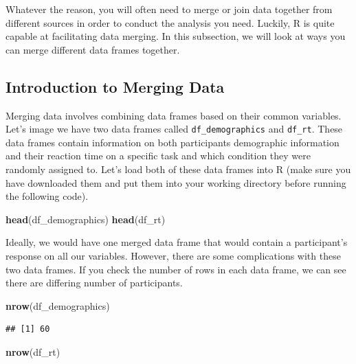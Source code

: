 \documentclass[
]{book}
\newenvironment{Shaded}{\begin{snugshade}}{\end{snugshade}}
\newcommand{\FunctionTok}[1]{\textcolor[rgb]{0.13,0.29,0.53}{\textbf{#1}}}
\newcommand{\NormalTok}[1]{#1}
\begin{document}
Whatever the reason, you will often need to merge or join data together from different sources in order to conduct the analysis you need. Luckily, R is quite capable at facilitating data merging. In this subsection, we will look at ways you can merge different data frames together.

\subsection{Introduction to Merging Data}\label{introduction-to-merging-data}

Merging data involves combining data frames based on their common variables. Let's image we have two data frames called \texttt{df\_demographics} and \texttt{df\_rt}. These data frames contain information on both participants demographic information and their reaction time on a specific task and which condition they were randomly assigned to. Let's load both of these data frames into R (make sure you have downloaded them and put them into your working directory before running the following code).

\begin{Shaded}
\begin{Highlighting}[]
\FunctionTok{head}\NormalTok{(df\_demographics)}
\FunctionTok{head}\NormalTok{(df\_rt)}
\end{Highlighting}
\end{Shaded}

Ideally, we would have one merged data frame that would contain a participant's response on all our variables. However, there are some complications with these two data frames. If you check the number of rows in each data frame, we can see there are differing number of participants.

\begin{Shaded}
\begin{Highlighting}[]
\FunctionTok{nrow}\NormalTok{(df\_demographics)}
\end{Highlighting}
\end{Shaded}

\begin{verbatim}
## [1] 60
\end{verbatim}

\begin{Shaded}
\begin{Highlighting}[]
\FunctionTok{nrow}\NormalTok{(df\_rt)}
\end{Highlighting}
\end{Shaded}
\end{document}
